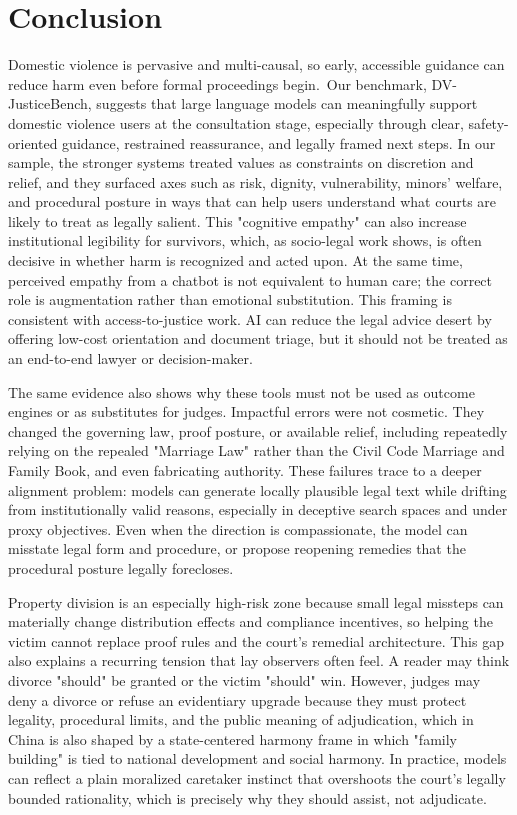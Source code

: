 \documentclass[pdflatex,sn-mathphys-ay]{sn-jnl}%
\theoremstyle{thmstyleone}%
\theoremstyle{thmstyletwo}%
\theoremstyle{thmstylethree}%
\begin{document}
\section{Conclusion}\label{sec6}
Domestic violence is pervasive and multi-causal, so early, accessible guidance can reduce harm even before formal proceedings begin.~Our benchmark, DV-JusticeBench, suggests that large language models can meaningfully support domestic violence users at the consultation stage, especially through clear, safety-oriented guidance, restrained reassurance, and legally framed next steps. In our sample, the stronger systems treated values as constraints on discretion and relief, and they surfaced axes such as risk, dignity, vulnerability, minors' welfare, and procedural posture in ways that can help users understand what courts are likely to treat as legally salient. This "cognitive empathy" can also increase institutional legibility for survivors, which, as socio-legal work shows, is often decisive in whether harm is recognized and acted upon. At the same time, perceived empathy from a chatbot is not equivalent to human care; the correct role is augmentation rather than emotional substitution. This framing is consistent with access-to-justice work. AI can reduce the legal advice desert by offering low-cost orientation and document triage, but it should not be treated as an end-to-end lawyer or decision-maker.

The same evidence also shows why these tools must not be used as outcome engines or as substitutes for judges. Impactful errors were not cosmetic. They changed the governing law, proof posture, or available relief, including repeatedly relying on the repealed "Marriage Law" rather than the Civil Code Marriage and Family Book, and even fabricating authority. These failures trace to a deeper alignment problem: models can generate locally plausible legal text while drifting from institutionally valid reasons, especially in deceptive search spaces and under proxy objectives. Even when the direction is compassionate, the model can misstate legal form and procedure, or propose reopening remedies that the procedural posture legally forecloses.

Property division is an especially high-risk zone because small legal missteps can materially change distribution effects and compliance incentives, so helping the victim cannot replace proof rules and the court's remedial architecture. This gap also explains a recurring tension that lay observers often feel. A reader may think divorce "should" be granted or the victim "should" win. However, judges may deny a divorce or refuse an evidentiary upgrade because they must protect legality, procedural limits, and the public meaning of adjudication, which in China is also shaped by a state-centered harmony frame in which "family building" is tied to national development and social harmony. In practice, models can reflect a plain moralized caretaker instinct that overshoots the court's legally bounded rationality, which is precisely why they should assist, not adjudicate.
\end{document}
